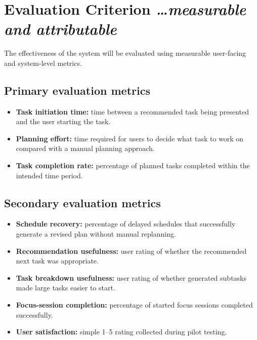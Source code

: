 \documentclass[11pt,a4paper]{article}
\newcommand{\BvrHint}[1]{%
  {\normalfont\normalsize\itshape\hfill #1}}
\begin{document}
\section{Evaluation Criterion %
\BvrHint{\ldots measurable and attributable}}

The effectiveness of the system will be evaluated using measurable
user-facing and system-level metrics.

\subsection{Primary evaluation metrics}

\begin{itemize}[leftmargin=0.7cm]
    \item \textbf{Task initiation time:} time between a recommended task being
    presented and the user starting the task.
    
    \item \textbf{Planning effort:} time required for users to decide what
    task to work on compared with a manual planning approach.
    
    \item \textbf{Task completion rate:} percentage of planned tasks completed
    within the intended time period.
\end{itemize}

\subsection{Secondary evaluation metrics}

\begin{itemize}[leftmargin=0.7cm]
    \item \textbf{Schedule recovery:} percentage of delayed schedules that
    successfully generate a revised plan without manual replanning.
    
    \item \textbf{Recommendation usefulness:} user rating of whether the
    recommended next task was appropriate.
    
    \item \textbf{Task breakdown usefulness:} user rating of whether generated
    subtasks made large tasks easier to start.
    
    \item \textbf{Focus-session completion:} percentage of started focus
    sessions completed successfully.
    
    \item \textbf{User satisfaction:} simple 1--5 rating collected during
    pilot testing.
\end{itemize}
\end{document}
